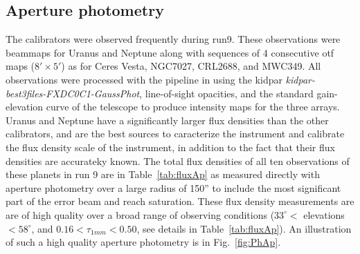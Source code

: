 \subsection{Aperture photometry}

The calibrators were observed frequently during run9. These observations were beammaps for Uranus and Neptune
along  with  sequences of 4 consecutive
otf maps ($8' \times 5'$) as for Ceres Vesta, NGC7027, CRL2688, and MWC349. All observations were processed with the pipeline in using
the kidpar {\it kidpar-best3files-FXDC0C1-GaussPhot}, line-of-sight opacities, and the standard
gain-elevation curve of the telescope to produce intensity maps for the three arrays.
Uranus and Neptune have a significantly larger flux densities than the other calibrators, and  are the best sources to caracterize the
instrument and calibrate the flux density  scale of the instrument,
in addition to the fact that their flux densities  are accurateky known.
The total flux densities of all ten observations of these planets in run 9 are in Table~\ref{tab:fluxAp} as
measured directly with aperture photometry over a large radius of 150'' to include the most significant part of the
error beam and reach saturation.  These flux density measurements are are of high quality over a broad range of observing conditions
($33^{\circ}<$ elevations $<58^{\circ}$, and   $0.16 < \tau_{1mm} < 0.50$, see details in  Table~\ref{tab:fluxAp}). An illustration of
such a high quality aperture photometry is in Fig.~\ref{fig:PhAp}.

